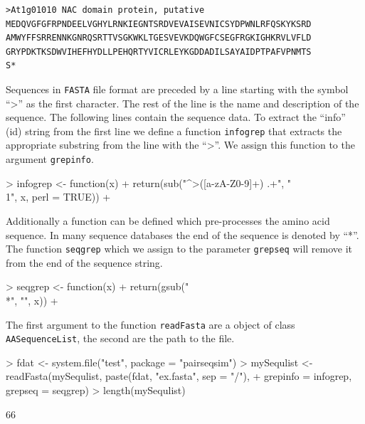 \documentclass{article}
\begin{document}
\begin{verbatim}
>At1g01010 NAC domain protein, putative
MEDQVGFGFRPNDEELVGHYLRNKIEGNTSRDVEVAISEVNICSYDPWNLRFQSKYKSRD
AMWYFFSRRENNKGNRQSRTTVSGKWKLTGESVEVKDQWGFCSEGFRGKIGHKRVLVFLD
GRYPDKTKSDWVIHEFHYDLLPEHQRTYVICRLEYKGDDADILSAYAIDPTPAFVPNMTS
S*
\end{verbatim}

Sequences in \texttt{FASTA} file format are preceded by a line starting with the symbol ``>'' as the first character. The rest of the line is the name and description of the sequence. The following lines contain the sequence data. To extract the ``info'' (id) string from the first line we define a function \texttt{infogrep} that extracts the appropriate substring from the line with the ``>''. We assign this function to the argument \texttt{grepinfo}. 

\begin{Schunk}
\begin{Sinput}
> infogrep <- function(x) {
+     return(sub("^>([a-zA-Z0-9]+) .+", "\\1", x, perl = TRUE))
+ }
\end{Sinput}
\end{Schunk}

Additionally a function can be defined which pre-processes the amino acid sequence. In many sequence databases the end of the sequence is denoted by ``*''. The function \texttt{seqgrep} which we assign to the parameter \texttt{grepseq} will remove it from the end of the sequence string.

\begin{Schunk}
\begin{Sinput}
> seqgrep <- function(x) {
+     return(gsub("\\*", "", x))
+ }
\end{Sinput}
\end{Schunk}

The first argument to the function \texttt{readFasta} are a object of class \texttt{AASequenceList}, the second are the path to the file.
\begin{Schunk}
\begin{Sinput}
> fdat <- system.file("test", package = "pairseqsim")
> mySequlist <- readFasta(mySequlist, paste(fdat, "ex.fasta", sep = "/"), 
+     grepinfo = infogrep, grepseq = seqgrep)
> length(mySequlist)
\end{Sinput}
\begin{Soutput}
[1] 66
\end{Soutput}
\end{Schunk}
\end{document}
